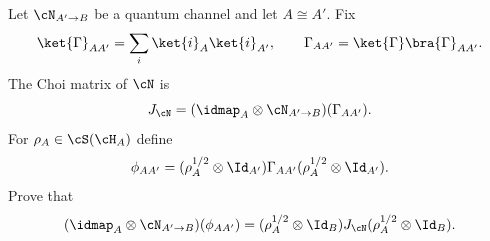 Let $\cN_{A'\to B}$ be a quantum channel and let $A\cong A'$. Fix
$$
\ket{\Gamma}_{AA'}=\sum_i\ket{i}_A\ket{i}_{A'},
\qquad
\Gamma_{AA'}=\ket{\Gamma}\bra{\Gamma}_{AA'}.
$$
The Choi matrix of $\cN$ is
$$
J_{\cN}=(\idmap_A\otimes\cN_{A'\to B})(\Gamma_{AA'}).
$$
For $\rho_A\in\cS(\cH_A)$ define
$$
\phi_{AA'}=(\rho_A^{1/2}\otimes\Id_{A'})\Gamma_{AA'}(\rho_A^{1/2}\otimes\Id_{A'}).
$$
Prove that
$$
(\idmap_A\otimes\cN_{A'\to B})(\phi_{AA'})
=
(\rho_A^{1/2}\otimes\Id_B)J_{\cN}(\rho_A^{1/2}\otimes\Id_B).
$$
